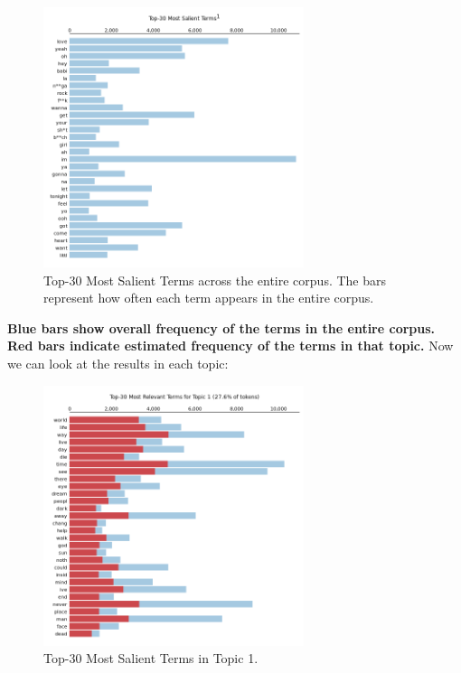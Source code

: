 \begin{center}
\begin{figure}[H]
  \centering
  \includegraphics[width=3in]{img/topics/png/general.png}
  \caption{Top-30 Most Salient Terms across the entire corpus. The bars
  represent how often each term appears in the entire corpus.}
  \label{Figure:fig_eh}
\end{figure}
\end{center}

 \textbf{Blue bars show overall frequency of the terms in the entire corpus.
 Red bars indicate estimated frequency of the terms in that topic.} Now we can
 look at the results in each topic:

\begin{center}
\begin{figure}[H]
  \centering
  \includegraphics[width=3in]{img/topics/png/t1.png}
  \caption{Top-30 Most Salient Terms in Topic 1.}
  \label{Figure:fig_eh}
\end{figure}
\end{center}

